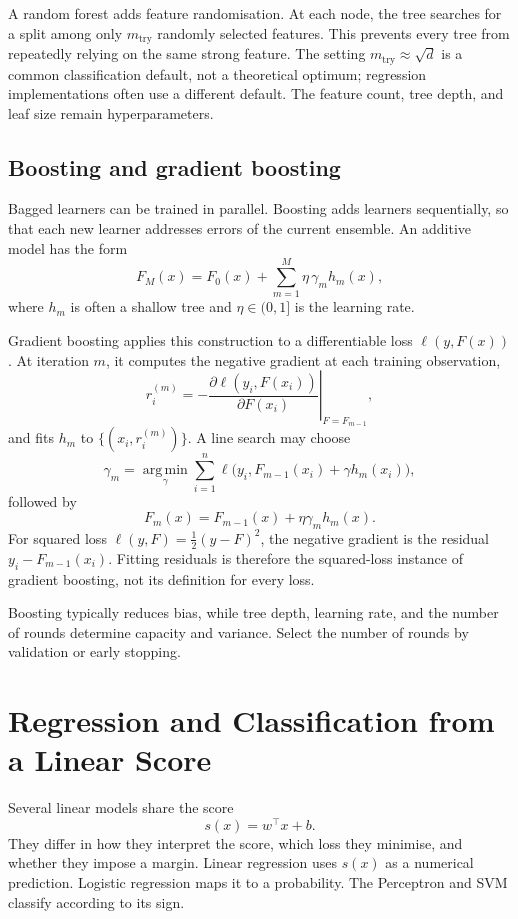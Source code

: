 A random forest adds feature randomisation. At each node, the tree searches for
a split among only $m_{\mathrm{try}}$ randomly selected features. This prevents
every tree from repeatedly relying on the same strong feature. The setting
$m_{\mathrm{try}}\approx\sqrt d$ is a common classification default, not a
theoretical optimum; regression implementations often use a different default.
The feature count, tree depth, and leaf size remain hyperparameters.

\EnsembleWorkflowFigure

\subsection{Boosting and gradient boosting}

Bagged learners can be trained in parallel. Boosting adds learners sequentially,
so that each new learner addresses errors of the current ensemble. An additive
model has the form
\[
F_M(x)=F_0(x)+\sum_{m=1}^{M}\eta\,\gamma_m h_m(x),
\]
where $h_m$ is often a shallow tree and $\eta\in(0,1]$ is the learning rate.

Gradient boosting applies this construction to a differentiable loss
$\ell(y,F(x))$. At iteration $m$, it computes the negative gradient at each
training observation,
\[
r_i^{(m)}=-\left.
\frac{\partial\ell(y_i,F(x_i))}{\partial F(x_i)}
\right|_{F=F_{m-1}},
\]
and fits $h_m$ to $\{(x_i,r_i^{(m)})\}$. A line search may choose
\[
\gamma_m=
\operatorname*{arg\,min}_{\gamma}
\sum_{i=1}^{n}
\ell\bigl(y_i,F_{m-1}(x_i)+\gamma h_m(x_i)\bigr),
\]
followed by
\[
F_m(x)=F_{m-1}(x)+\eta\gamma_mh_m(x).
\]
For squared loss $\ell(y,F)=\tfrac12(y-F)^2$, the negative gradient is the
residual $y_i-F_{m-1}(x_i)$. Fitting residuals is therefore the squared-loss
instance of gradient boosting, not its definition for every loss.

Boosting typically reduces bias, while tree depth, learning rate, and the number
of rounds determine capacity and variance. Select the number of rounds by
validation or early stopping.


\section{Regression and Classification from a Linear Score}

Several linear models share the score
\[
s(x)=w^\top x+b.
\]
They differ in how they interpret the score, which loss they minimise, and
whether they impose a margin. Linear regression uses $s(x)$ as a numerical
prediction. Logistic regression maps it to a probability. The Perceptron and
SVM classify according to its sign.


